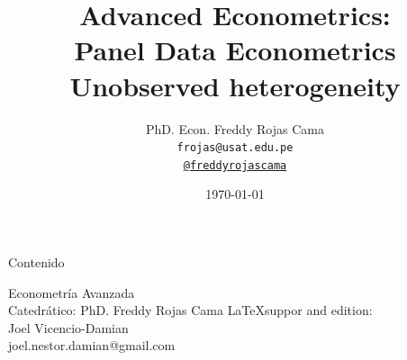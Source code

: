 \documentclass[10pt, aspectratio=169, compress]{beamer}
\title{Advanced Econometrics:\\
	Panel Data Econometrics\\
	Unobserved heterogeneity}
\author[Freddy Rojas C.]{\large{PhD. Econ. Freddy Rojas Cama}\\
	\tiny{\texttt{frojas@usat.edu.pe} {\color{black}{\faIcon{envelope}}}}\\
	\texttt{\href{https://twitter.com/freddyrojascama?s=20}{@freddyrojascama}} {\color{twit}{\faIcon{twitter}}}}
\institute{\large Universidad Católica Santo Toribio de Mogrovejo}
\date{\today}
\begin{document}
	\begin{frame}[plain]
		\maketitle
	\end{frame}
	

\begin{frame}{Contenido}
	\tableofcontents
\end{frame}	

	
	
	
	
	
\miniframesoff
	\begin{frame}
			\vspace{3cm}
				Econometría Avanzada\\
				Catedrático: PhD. Freddy Rojas Cama
			\vspace{3cm}
			\flushleft 
		{\small
		\LaTeX \enskip suppor and edition:\\
		Joel Vicencio-Damian\\
			\vspace{-0.28cm}
		joel.nestor.damian@gmail.com }
	\end{frame}

\end{document}
